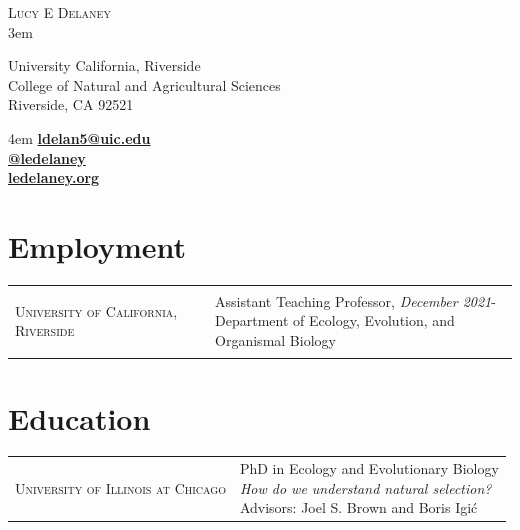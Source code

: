 \documentclass[]{article}
\begin{document}
\BgThispage
\pagestyle{alldocument}

{\fontsize{20}{64}\selectfont \textsc{Lucy E Delaney}}\\
\leftskip 3em
\begin{multicols}{2}

University California, Riverside\\
College of Natural and Agricultural Sciences\\
Riverside, CA 92521

\columnbreak

\begin{flushright}
\rightskip 4em
\href{mailto:ldelan5@uic.edu}{\textbf{ldelan5@uic.edu}} \faPaperPlane\\
\href{https://github.com/ledelaney}{\textbf{@ledelaney}} \faGithub\\
\href{https://ledelaney.org}{\textbf{ledelaney.org}} \faDesktop
\end{flushright}

\end{multicols}

\vspace{3mm}

\section{\fontsize{16}{48}\selectfont Employment}

\begin{tabular}{l | l}
\parbox{0.30\textwidth}{
\begin{center}
\textsc{University of California, Riverside}
\end{center}
}
&
\parbox{0.65\textwidth}{
Assistant Teaching Professor, \textit{December 2021}-\\
Department of Ecology, Evolution, and Organismal Biology}
\end{tabular}


\section{\fontsize{16}{48}\selectfont Education}

\begin{tabular}{l | l}
\parbox{0.30\textwidth}{
\begin{center}
\textsc{University of Illinois at Chicago}
\end{center}
}
&
\parbox{0.65\textwidth}{
PhD in Ecology and Evolutionary Biology\\
\textit{How do we understand natural selection?}\\
Advisors: Joel S. Brown and Boris Igi\'c}
\end{tabular}
\end{document}
